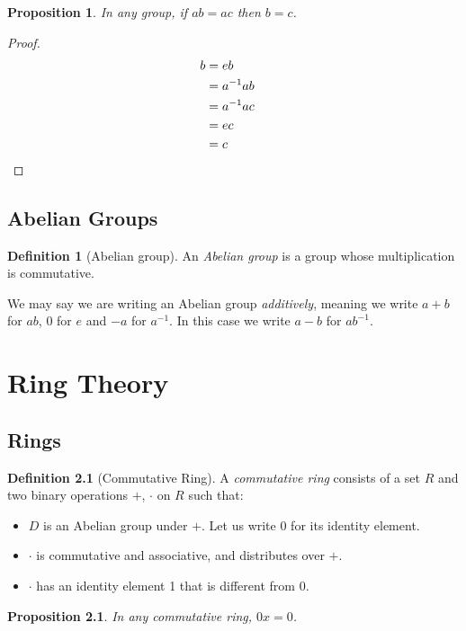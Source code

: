 \documentclass{book}
\let\qed\relax
\newtheorem{prop}[ax]{Proposition}
\theoremstyle{definition}
\newtheorem{df}[ax]{Definition}
\begin{document}
\begin{prop}
\label{prop:groupcancel}
In any group, if $ab = ac$ then $b = c$.
\end{prop}

\begin{proof}
\pf
\begin{align*}
b & = eb \\
& = a^{-1}ab \\
& = a^{-1}ac \\
& = ec \\
& = c & \qed
\end{align*}
\end{proof}

\section{Abelian Groups}

\begin{df}[Abelian group]
An \emph{Abelian group} is a group whose multiplication is commutative.

We may say we are writing an Abelian group \emph{additively}, meaning we write $a + b$ for $ab$, $0$ for $e$ and $-a$ for $a^{-1}$. In this case we write $a-b$ for $ab^{-1}$.
\end{df}

\chapter{Ring Theory}

\section{Rings}

\begin{df}[Commutative Ring]
A \emph{commutative ring} consists of a set $R$ and two binary operations $+$, $\cdot$ on $R$ such that:
\begin{itemize}
\item
$D$ is an Abelian group under $+$. Let us write 0 for its identity element.
\item
$\cdot$ is commutative and associative, and distributes over $+$.
\item
$\cdot$ has an identity element 1 that is different from 0.
\end{itemize}
\end{df}

\begin{prop}
\label{prop:timeszero}
In any commutative ring, $0x = 0$.
\end{prop}
\end{document}

